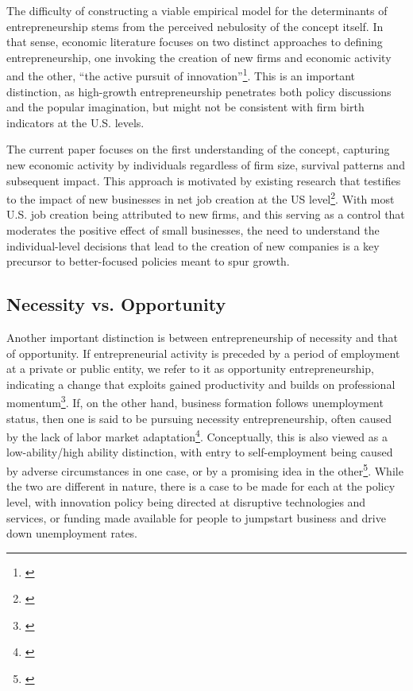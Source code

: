 The difficulty of constructing a viable empirical model for the determinants of entrepreneurship stems from the perceived nebulosity of the concept itself. In that sense, economic literature focuses on two distinct approaches to defining entrepreneurship, one invoking the creation of new firms and economic activity and the other, ``the active pursuit of innovation''\footnote{\cite[Page~367]{rocha2004entrepreneurship}}. This is an important distinction, as high-growth entrepreneurship penetrates both policy discussions and the popular imagination, but might not be consistent with firm birth indicators at the U.S. levels. 

The current paper focuses on the first understanding of the concept, capturing new economic activity by individuals regardless of firm size, survival patterns and subsequent impact. This approach is motivated by existing research that testifies to the impact of new businesses in net job creation at the US level\footnote{\cite{HaltiwangerJarminMiranda2013}}. With most U.S. job creation being attributed to new firms, and this serving as a control that moderates the positive effect of small businesses, the need to understand the individual-level decisions that lead to the creation of new companies is a key precursor to better-focused policies meant to spur growth.

\subsection{Necessity vs. Opportunity}

Another important distinction is between entrepreneurship of necessity and that of opportunity. If entrepreneurial activity is preceded by a period of employment at a private or public entity, we refer to it as opportunity entrepreneurship, indicating a change that exploits gained productivity and builds on professional momentum\footnote{\cite{Deli2011}}. If, on the other hand, business formation follows unemployment status, then one is said to be pursuing necessity entrepreneurship, often caused by the lack of labor market adaptation\footnote{\cite{Deli2011}}. Conceptually, this is also viewed as a low-ability/high ability distinction, with entry to self-employment being caused by adverse circumstances in one case, or by a promising idea in the other\footnote{\cite{Deli2011}}. While the two are different in nature, there is a case to be made for each at the policy level, with innovation policy being directed at disruptive technologies and services, or funding made available for people to jumpstart business and drive down unemployment rates. 

